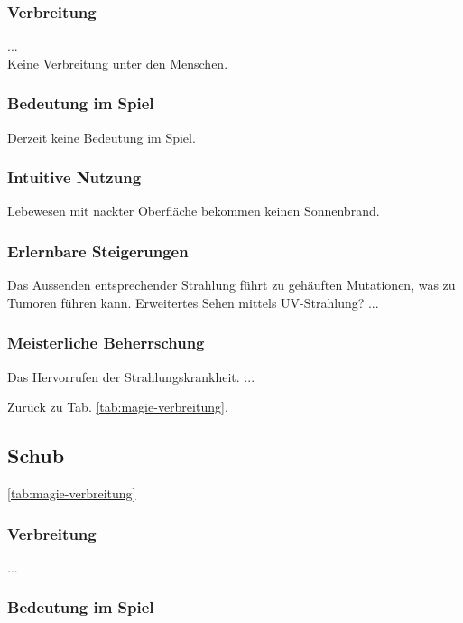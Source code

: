 \subsubsection{Verbreitung}
...\\
Keine Verbreitung unter den Menschen.

\subsubsection{Bedeutung im Spiel}
Derzeit keine Bedeutung im Spiel.

\subsubsection{Intuitive Nutzung}
Lebewesen mit nackter Oberfläche bekommen keinen Sonnenbrand.

\subsubsection{Erlernbare Steigerungen}
\begin{outline}
	\1 Das Aussenden entsprechender Strahlung führt zu gehäuften Mutationen, was zu Tumoren führen kann.
	\1 Erweitertes Sehen mittels UV-Strahlung?
	\1 ...
\end{outline}

\subsubsection{Meisterliche Beherrschung} 
\begin{outline}
	\1 Das Hervorrufen der Strahlungskrankheit.
	\1 ...
\end{outline}
Zurück zu Tab. \ref{tab:magie-verbreitung}.



\subsection{Schub}\label{sec:schubmagie} \ref{tab:magie-verbreitung} %

\subsubsection{Verbreitung}
...\\

\subsubsection{Bedeutung im Spiel}

